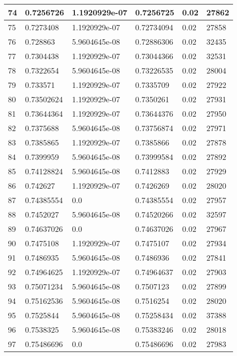 \begin{longtable}{|l|l|l|l|l|l|}
74 & 0.7256726 & 1.1920929e-07 & 0.7256725 & 0.02 & 27862 \\ \hline 
75 & 0.7273408 & 1.1920929e-07 & 0.72734094 & 0.02 & 27858 \\ \hline 
76 & 0.728863 & 5.9604645e-08 & 0.72886306 & 0.02 & 32435 \\ \hline 
77 & 0.7304438 & 1.1920929e-07 & 0.73044366 & 0.02 & 32531 \\ \hline 
78 & 0.7322654 & 5.9604645e-08 & 0.73226535 & 0.02 & 28004 \\ \hline 
79 & 0.733571 & 1.1920929e-07 & 0.7335709 & 0.02 & 27922 \\ \hline 
80 & 0.73502624 & 1.1920929e-07 & 0.7350261 & 0.02 & 27931 \\ \hline 
81 & 0.73644364 & 1.1920929e-07 & 0.73644376 & 0.02 & 27950 \\ \hline 
82 & 0.7375688 & 5.9604645e-08 & 0.73756874 & 0.02 & 27971 \\ \hline 
83 & 0.7385865 & 1.1920929e-07 & 0.7385866 & 0.02 & 27878 \\ \hline 
84 & 0.7399959 & 5.9604645e-08 & 0.73999584 & 0.02 & 27892 \\ \hline 
85 & 0.74128824 & 5.9604645e-08 & 0.7412883 & 0.02 & 27929 \\ \hline 
86 & 0.742627 & 1.1920929e-07 & 0.7426269 & 0.02 & 28020 \\ \hline 
87 & 0.74385554 & 0.0 & 0.74385554 & 0.02 & 27957 \\ \hline 
88 & 0.7452027 & 5.9604645e-08 & 0.74520266 & 0.02 & 32597 \\ \hline 
89 & 0.74637026 & 0.0 & 0.74637026 & 0.02 & 27967 \\ \hline 
90 & 0.7475108 & 1.1920929e-07 & 0.7475107 & 0.02 & 27934 \\ \hline 
91 & 0.7486935 & 5.9604645e-08 & 0.7486936 & 0.02 & 27841 \\ \hline 
92 & 0.74964625 & 1.1920929e-07 & 0.74964637 & 0.02 & 27903 \\ \hline 
93 & 0.75071234 & 5.9604645e-08 & 0.7507123 & 0.02 & 27899 \\ \hline 
94 & 0.75162536 & 5.9604645e-08 & 0.7516254 & 0.02 & 28020 \\ \hline 
95 & 0.7525844 & 5.9604645e-08 & 0.75258434 & 0.02 & 37388 \\ \hline 
96 & 0.7538325 & 5.9604645e-08 & 0.75383246 & 0.02 & 28018 \\ \hline 
97 & 0.75486696 & 0.0 & 0.75486696 & 0.02 & 27983 \\ \hline 

\end{longtable}
